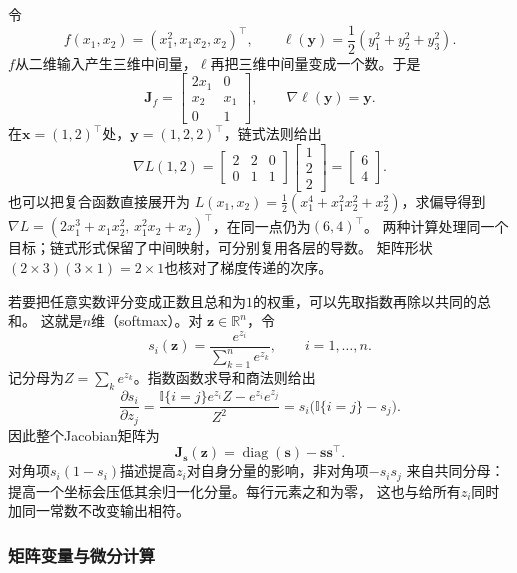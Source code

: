 \begin{example}[从中间向量求回复合目标的梯度]
\label{ex:analysis-chain-rule-calculation}
令
\[
  f(x_1,x_2)=(x_1^2,x_1x_2,x_2)^\top,
  \qquad \ell(\bm y)=\frac12(y_1^2+y_2^2+y_3^2).
\]
$f$从二维输入产生三维中间量，$\ell$再把三维中间量变成一个数。于是
\[
  \bm J_f=\begin{bmatrix}2x_1&0\\x_2&x_1\\0&1\end{bmatrix},
  \qquad \nabla\ell(\bm y)=\bm y.
\]
在$\bm x=(1,2)^\top$处，$\bm y=(1,2,2)^\top$，链式法则给出
\[
  \nabla L(1,2)
  =\begin{bmatrix}2&2&0\\0&1&1\end{bmatrix}
    \begin{bmatrix}1\\2\\2\end{bmatrix}
  =\begin{bmatrix}6\\4\end{bmatrix}.
\]
也可以把复合函数直接展开为
$L(x_1,x_2)=\tfrac12(x_1^4+x_1^2x_2^2+x_2^2)$，求偏导得到
$\nabla L=(2x_1^3+x_1x_2^2,\,x_1^2x_2+x_2)^\top$，在同一点仍为$(6,4)^\top$。
两种计算处理同一个目标；链式形式保留了中间映射，可分别复用各层的导数。
矩阵形状$(2\times3)(3\times1)=2\times1$也核对了梯度传递的次序。
\end{example}

若要把任意实数评分变成正数且总和为$1$的权重，可以先取指数再除以共同的总和。
这就是$n$维（softmax）。对
$\bm{z}\in\mathbb{R}^n$，令
\[
  s_i(\bm{z})
  =
  \frac{e^{z_i}}{\sum_{k=1}^n e^{z_k}},
  \qquad i=1,\ldots,n.
\]
记分母为$Z=\sum_k e^{z_k}$。指数函数求导和商法则给出
\[
  \frac{\partial s_i}{\partial z_j}
  =
  \frac{\mathbb{I}\{i=j\}e^{z_i}Z-e^{z_i}e^{z_j}}{Z^2}
  =
  s_i\bigl(\mathbb{I}\{i=j\}-s_j\bigr).
\]
因此整个Jacobian矩阵为
\begin{equation}
  \bm{J}_{\bm{s}}(\bm{z})
  =
  \operatorname{diag}(\bm{s})-\bm{s}\bm{s}^{\top}.
\label{eq:analysis-softmax-jacobian}
\end{equation}
对角项$s_i(1-s_i)$描述提高$z_i$对自身分量的影响，非对角项$-s_is_j$
来自共同分母：提高一个坐标会压低其余归一化分量。每行元素之和为零，
这也与给所有$z_i$同时加同一常数不改变输出相符。
\subsubsection{矩阵变量与微分计算}

